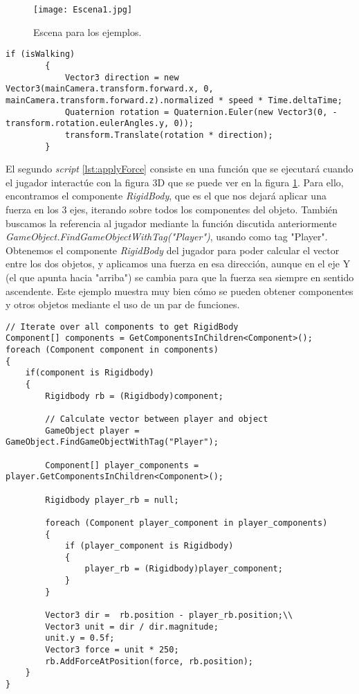 \documentclass{pre-tfg}
\begin{document}
\begin{figure}[htb]
	\centering
	\texttt{[image: Escena1.jpg]}
	\caption{Escena para los ejemplos.}
	\label{fig:Escena1}
\end{figure}

\begin{spacing}{1}
\begin{lstlisting}[float=htbp, caption=Translación y rotación del jugador en el movimiento automático, label=lst:autowalk]
if (isWalking)
        {
            Vector3 direction = new Vector3(mainCamera.transform.forward.x, 0, mainCamera.transform.forward.z).normalized * speed * Time.deltaTime;
            Quaternion rotation = Quaternion.Euler(new Vector3(0, -transform.rotation.eulerAngles.y, 0));
            transform.Translate(rotation * direction);
        }
\end{lstlisting}
\end{spacing}


El segundo \textit{script} \ref{lst:applyForce} consiste en una función que se ejecutará cuando el jugador interactúe con la figura 3D que se puede ver en la figura \ref{fig:Escena1}. Para ello, encontramos el componente \textit{RigidBody}, que es el que nos dejará aplicar una fuerza en los 3 ejes, iterando sobre todos los componentes del objeto. También buscamos la referencia al jugador mediante la función discutida anteriormente \textit{GameObject.FindGameObjectWithTag("Player")}, usando como tag "Player". Obtenemos el componente \textit{RigidBody} del jugador para poder calcular el vector entre los dos objetos, y aplicamos una fuerza en esa dirección, aunque en el eje Y (el que apunta hacia "arriba") se cambia para que la fuerza sea siempre en sentido ascendente. Este ejemplo muestra muy bien cómo se pueden obtener componentes y otros objetos mediante el uso de un par de funciones.

\begin{spacing}{1}
\begin{lstlisting}[float=htbp, caption=Aplicación de una fuerza a un objeto con físicas, label=lst:applyForce]
// Iterate over all components to get RigidBody
Component[] components = GetComponentsInChildren<Component>();
foreach (Component component in components)
{
	if(component is Rigidbody)
	{
		Rigidbody rb = (Rigidbody)component;

		// Calculate vector between player and object
		GameObject player = GameObject.FindGameObjectWithTag("Player");

		Component[] player_components = player.GetComponentsInChildren<Component>();

		Rigidbody player_rb = null;

		foreach (Component player_component in player_components)
		{
			if (player_component is Rigidbody)
			{
				player_rb = (Rigidbody)player_component;
			}
		}

		Vector3 dir =  rb.position - player_rb.position;\\
		Vector3 unit = dir / dir.magnitude;
		unit.y = 0.5f;
		Vector3 force = unit * 250;
		rb.AddForceAtPosition(force, rb.position);
	}
}
\end{lstlisting}
\end{spacing}
\end{document}
